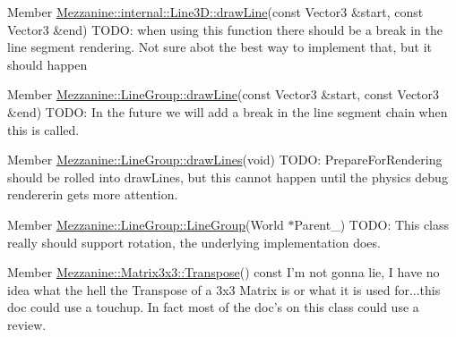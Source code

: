 \label{todo__todo000016}
\hypertarget{todo__todo000016}{}
 
\begin{DoxyDescription}
\item[Member \hyperlink{classMezzanine_1_1internal_1_1Line3D_a17264ad5672bef8807ce6b4a8366e573}{Mezzanine::internal::Line3D::drawLine}(const Vector3 \&start, const Vector3 \&end) ]TODO: when using this function there should be a break in the line segment rendering. Not sure abot the best way to implement that, but it should happen 
\end{DoxyDescription}

\label{todo__todo000018}
\hypertarget{todo__todo000018}{}
 
\begin{DoxyDescription}
\item[Member \hyperlink{classMezzanine_1_1LineGroup_acadb6f8ccbe70828b094f07a11f276ac}{Mezzanine::LineGroup::drawLine}(const Vector3 \&start, const Vector3 \&end) ]TODO: In the future we will add a break in the line segment chain when this is called. 
\end{DoxyDescription}

\label{todo__todo000019}
\hypertarget{todo__todo000019}{}
 
\begin{DoxyDescription}
\item[Member \hyperlink{classMezzanine_1_1LineGroup_a85da1685525915f1e07d685b98f79f23}{Mezzanine::LineGroup::drawLines}(void) ]TODO: PrepareForRendering should be rolled into drawLines, but this cannot happen until the physics debug rendererin gets more attention. 
\end{DoxyDescription}

\label{todo__todo000017}
\hypertarget{todo__todo000017}{}
 
\begin{DoxyDescription}
\item[Member \hyperlink{classMezzanine_1_1LineGroup_a8789254da1d3e930681b793165fedeca}{Mezzanine::LineGroup::LineGroup}(World $\ast$Parent\_\-) ]TODO: This class really should support rotation, the underlying implementation does. 
\end{DoxyDescription}

\label{todo__todo000020}
\hypertarget{todo__todo000020}{}
 
\begin{DoxyDescription}
\item[Member \hyperlink{classMezzanine_1_1Matrix3x3_ac759aa60d4dc6dee040b6741b6d44392}{Mezzanine::Matrix3x3::Transpose}() const  ]I'm not gonna lie, I have no idea what the hell the Transpose of a 3x3 Matrix is or what it is used for...this doc could use a touchup. In fact most of the doc's on this class could use a review. 
\end{DoxyDescription}

